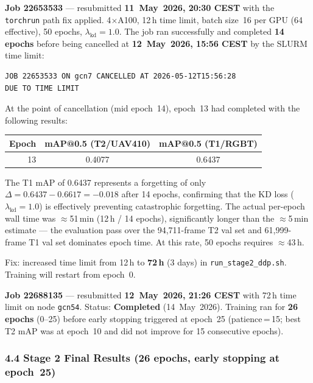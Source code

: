 \textbf{Job 22653533} — resubmitted \textbf{11~May~2026, 20:30 CEST}
with the \texttt{torchrun} path fix applied.
4$\times$A100, 12\,h time limit, batch size~16 per GPU (64 effective),
50 epochs, $\lambda_{\text{kd}}=1.0$.
The job ran successfully and completed \textbf{14 epochs} before being
cancelled at \textbf{12~May~2026, 15:56 CEST} by the SLURM time limit:
\begin{verbatim}
JOB 22653533 ON gcn7 CANCELLED AT 2026-05-12T15:56:28
DUE TO TIME LIMIT
\end{verbatim}
At the point of cancellation (mid epoch~14), epoch~13 had completed
with the following results:
\begin{center}
\small
\begin{tabular}{rcc}
\hline
\textbf{Epoch} & \textbf{mAP@0.5 (T2/UAV410)} & \textbf{mAP@0.5 (T1/RGBT)} \\
\hline
13 & 0.4077 & 0.6437 \\
\hline
\end{tabular}
\end{center}
The T1 mAP of 0.6437 represents a forgetting of only
$\Delta = 0.6437 - 0.6617 = -0.018$ after 14 epochs, confirming that
the KD loss ($\lambda_{\text{kd}}=1.0$) is effectively preventing
catastrophic forgetting. The actual per-epoch wall time was
$\approx$51\,min (12\,h / 14 epochs), significantly longer than the
$\approx$5\,min estimate — the evaluation pass over the 94,711-frame
T2 val set and 61,999-frame T1 val set dominates epoch time.
At this rate, 50 epochs requires $\approx$43\,h.

Fix: increased time limit from 12\,h to \textbf{72\,h} (3 days) in
\texttt{run\_stage2\_ddp.sh}. Training will restart from epoch~0.

\textbf{Job 22688135} — resubmitted \textbf{12~May~2026, 21:26 CEST}
with 72\,h time limit on node \texttt{gcn54}. Status: \textbf{Completed}
(14~May~2026). Training ran for \textbf{26 epochs} (0--25) before
early stopping triggered at epoch~25 (patience\,=\,15; best T2 mAP
was at epoch~10 and did not improve for 15 consecutive epochs).

\subsubsection*{4.4 Stage 2 Final Results (26 epochs, early stopping at epoch~25)}

